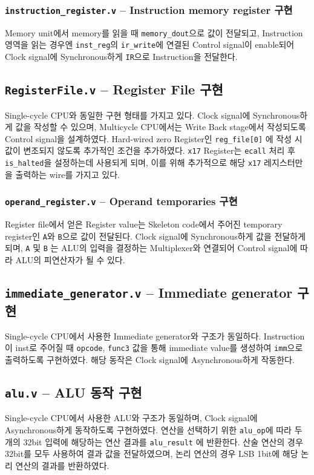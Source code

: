 \documentclass{scrartcl}
\begin{document}
\subsubsection{\texttt{instruction\_register.v} -- Instruction memory register 구현}
Memory unit에서 memory를 읽을 때 \texttt{memory\_dout}으로 값이 전달되고, Instruction 영역을 읽는 경우엔 \texttt{inst\_reg}의
\texttt{ir\_write}에 연결된 Control signal이 enable되어 Clock signal에 Synchronous하게 \texttt{IR}으로 Instruction을 전달한다.

\subsection{\texttt{RegisterFile.v} -- Register File 구현}
Single-cycle CPU와 동일한 구현 형태를 가지고 있다. Clock signal에 Synchronous하게 값을 작성할 수 있으며,
Multicycle CPU에서는 Write Back stage에서 작성되도록 Control signal을 설계하였다.
Hard-wired zero Register인 \texttt{reg\_file[0]} 에 작성 시 값이 변조되지 않도록 추가적인 조건을 추가하였다.
\texttt{x17} Register는 \texttt{ecall} 처리 후 \texttt{is\_halted}을 설정하는데 사용되게 되며, 이를 위해
추가적으로 해당 \texttt{x17} 레지스터만을 출력하는 wire를 가지고 있다.

\subsubsection{\texttt{operand\_register.v} -- Operand temporaries 구현}
Register file에서 얻은 Register value는 Skeleton code에서 주어진 temporary register인 \texttt{A}와 \texttt{B}으로
값이 전달된다. Clock signal에 Synchronous하게 값을 전달하게 되며, \texttt{A} 및 \texttt{B} 는 ALU의 입력을
결정하는 Multiplexer와 연결되어 Control signal에 따라 ALU의 피연산자가 될 수 있다.

\subsection{\texttt{immediate\_generator.v} -- Immediate generator 구현}
Single-cycle CPU에서 사용한 Immediate generator와 구조가 동일하다.
Instruction이 inst로 주어질 때 \texttt{opcode}, \texttt{func3} 값을 통해 immediate value를 생성하여
\texttt{imm}으로 출력하도록 구현하였다. 해당 동작은 Clock signal에 Asynchronous하게 작동한다.

\subsection{\texttt{alu.v} -- ALU 동작 구현}
Single-cycle CPU에서 사용한 ALU와 구조가 동일하며, Clock signal에 Asynchronous하게 동작하도록 구현하였다.
연산을 선택하기 위한 \texttt{alu\_op}에 따라 두 개의 32bit 입력에 해당하는 연산 결과를 \texttt{alu\_result} 에 반환한다.
산술 연산의 경우 32bit를 모두 사용하여 결과 값을 전달하였으며, 논리 연산의 경우 LSB 1bit에 해당 논리 연산의 결과를 반환하였다.
\end{document}
